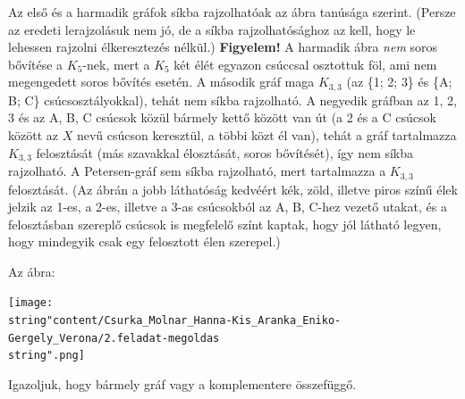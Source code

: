 \begin{solution}
	Az első és a harmadik gráfok síkba rajzolhatóak az ábra tanúsága szerint.
	(Persze az eredeti lerajzolásuk nem jó, de a síkba rajzolhatósághoz
	az kell, hogy le lehessen rajzolni élkeresztezés nélkül.) \textbf{Figyelem!}
	A harmadik ábra \emph{nem} soros bővítése a $K_{5}$-nek, mert a $K_{5}$
	két élét egyazon csúccsal osztottuk föl, ami nem megengedett soros
	bővítés esetén. A második gráf maga $K_{3,3}$ (az \{1; 2; 3\} és
	\{A; B; C\} csúcsosztályokkal), tehát nem síkba rajzolható. A negyedik
	gráfban az 1, 2, 3 és az A, B, C csúcsok közül bármely kettő között
	van út (a 2 és a C csúcsok között az $X$ nevű csúcson keresztül,
	a többi közt él van), tehát a gráf tartalmazza $K_{3,3}$ felosztását
	(más szavakkal élosztását, soros bővítését), így nem síkba rajzolható.
	A Petersen-gráf sem síkba rajzolható, mert tartalmazza a $K_{3,3}$
	felosztását. (Az ábrán a jobb láthatóság kedvéért kék, zöld, illetve
	piros színű élek jelzik az 1-es, a 2-es, illetve a 3-as csúcsokból
	az A, B, C-hez vezető utakat, és a felosztásban szereplő csúcsok is
	megfelelő színt kaptak, hogy jól látható legyen, hogy mindegyik csak
	egy felosztott élen szerepel.)
	
	Az ábra:
	\begin{center}
		\texttt{[image: \\string"content/Csurka\_Molnar\_Hanna-Kis\_Aranka\_Eniko-Gergely\_Verona/2.feladat-megoldas\\string".png]}
	\end{center}
\end{solution}
\begin{problem}
	Igazoljuk, hogy bármely gráf vagy a komplementere összefüggő. 
\end{problem}


